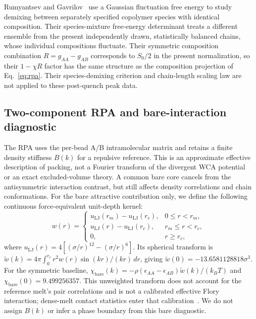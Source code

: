 Rumyantsev and Gavrilov~\cite{RumyantsevGavrilov2026} use a Gaussian fluctuation free energy to study demixing between separately specified copolymer species with identical composition. Their species-mixture free-energy determinant treats a different ensemble from the present independently drawn, statistically balanced chains, whose individual compositions fluctuate. Their symmetric composition combination $R=g_{AA}-g_{AB}$ corresponds to $S_0/2$ in the present normalization, so their $1-\chi R$ factor has the same structure as the composition projection of Eq.~\ref{eq:rpa}. Their species-demixing criterion and chain-length scaling law are not applied to these post-quench peak data.


\subsection{Two-component RPA and bare-interaction diagnostic}

The RPA uses the per-bead A/B intramolecular matrix and retains a finite density stiffness $B(k)$ for a repulsive reference. This is an approximate effective description of packing, not a Fourier transform of the divergent WCA potential or an exact excluded-volume theory. A common bare core cancels from the antisymmetric interaction contrast, but still affects density correlations and chain conformations. For the bare attractive contribution only, we define the following continuous force-equivalent unit-depth kernel:
\begin{equation}
w(r)=\begin{cases}
u_{\mathrm{LJ}}(r_m)-u_{\mathrm{LJ}}(r_c), & 0\le r<r_m,\\
u_{\mathrm{LJ}}(r)-u_{\mathrm{LJ}}(r_c), & r_m\le r<r_c,\\
0,&r\ge r_c,
\end{cases}
\end{equation}
where $u_{\mathrm{LJ}}(r)=4[(\sigma/r)^{12}-(\sigma/r)^6]$. Its spherical transform is $\widetilde w(k)=4\pi\int_0^{r_c}r^2w(r)\sin(kr)/(kr)\,dr$, giving $\widetilde w(0)=-13.6581128818\sigma^3$. For the symmetric baseline, $\chi_{\mathrm{bare}}(k)=-\rho(\epsilon_{AA}-\epsilon_{AB})\widetilde w(k)/(k_BT)$ and $\chi_{\mathrm{bare}}(0)=9.499256357$. This unweighted transform does not account for the reference melt's pair correlations and is not a calibrated effective Flory interaction; dense-melt contact statistics enter that calibration~\cite{MorseChung2009}. We do not assign $B(k)$ or infer a phase boundary from this bare diagnostic.


